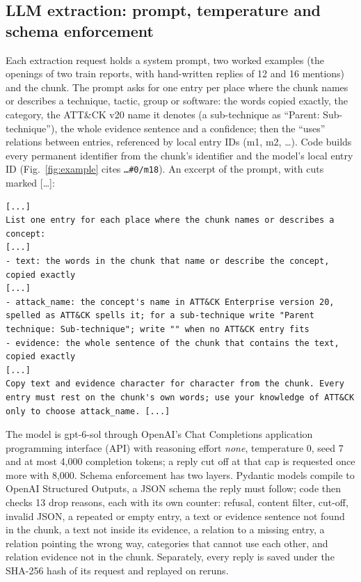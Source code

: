 \documentclass[conference,letterpaper]{IEEEtran}
\newcommand{\code}[1]{\texttt{#1}}
\begin{document}
\subsection{LLM extraction: prompt, temperature and schema enforcement}\label{sec:llmext}
Each extraction request holds a system prompt, two worked examples (the openings of two train reports, with hand-written replies of 12 and 16 mentions) and the chunk. The prompt asks for one entry per place where the chunk names or describes a technique, tactic, group or software: the words copied exactly, the category, the ATT\&CK v20 name it denotes (a sub-technique as ``Parent: Sub-technique''), the whole evidence sentence and a confidence; then the ``uses'' relations between entries, referenced by local entry IDs (m1, m2, \ldots). Code builds every permanent identifier from the chunk's identifier and the model's local entry ID (Fig.~\ref{fig:example} cites \code{\ldots\#0/m18}). An excerpt of the prompt, with cuts marked [\ldots]:
\begin{lstlisting}
[...]
List one entry for each place where the chunk names or describes a concept:
[...]
- text: the words in the chunk that name or describe the concept, copied exactly
[...]
- attack_name: the concept's name in ATT&CK Enterprise version 20, spelled as ATT&CK spells it; for a sub-technique write "Parent technique: Sub-technique"; write "" when no ATT&CK entry fits
- evidence: the whole sentence of the chunk that contains the text, copied exactly
[...]
Copy text and evidence character for character from the chunk. Every entry must rest on the chunk's own words; use your knowledge of ATT&CK only to choose attack_name. [...]
\end{lstlisting}
The model is gpt-6-sol through OpenAI's Chat Completions application programming interface (API) with reasoning effort \emph{none}, temperature 0, seed 7 and at most 4,000 completion tokens; a reply cut off at that cap is requested once more with 8,000. Schema enforcement has two layers. Pydantic models compile to OpenAI Structured Outputs, a JSON schema the reply must follow; code then checks 13 drop reasons, each with its own counter: refusal, content filter, cut-off, invalid JSON, a repeated or empty entry, a text or evidence sentence not found in the chunk, a text not inside its evidence, a relation to a missing entry, a relation pointing the wrong way, categories that cannot use each other, and relation evidence not in the chunk. Separately, every reply is saved under the \mbox{SHA-256} hash of its request and replayed on reruns.
\end{document}
